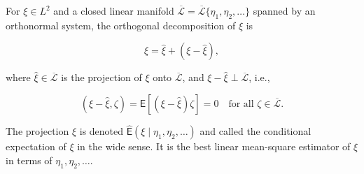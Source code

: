 For $\xi \in L^2$ and a closed linear manifold $\overline{\mathcal{L}} = \overline{\mathcal{L}}\{\eta_1, \eta_2, \ldots\}$ spanned by an orthonormal system, the orthogonal decomposition of $\xi$ is

$$\xi = \hat{\xi} + (\xi - \hat{\xi}),$$

where $\hat{\xi} \in \overline{\mathcal{L}}$ is the projection of $\xi$ onto $\overline{\mathcal{L}}$, and $\xi - \hat{\xi} \perp \overline{\mathcal{L}}$, i.e.,

$$(\xi - \hat{\xi}, \zeta) = \mathsf{E}[(\xi - \hat{\xi})\zeta] = 0 \quad \text{for all } \zeta \in \overline{\mathcal{L}}.$$

The projection $\hat{\xi}$ is denoted $\hat{\mathsf{E}}(\xi \mid \eta_1, \eta_2, \ldots)$ and called the conditional expectation of $\xi$ in the wide sense. It is the best linear mean-square estimator of $\xi$ in terms of $\eta_1, \eta_2, \ldots$.
